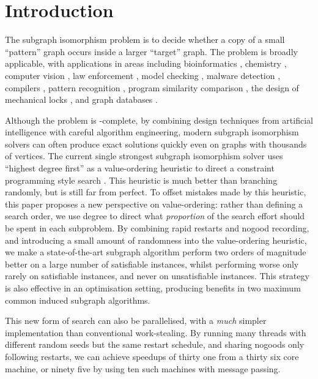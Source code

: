 \documentclass[runningheads]{llncs}
\begin{document}
\section{Introduction}

The subgraph isomorphism problem is to decide whether a copy of a small ``pattern'' graph occurs
inside a larger ``target'' graph. The problem is broadly applicable, with applications in areas
including bioinformatics \cite{DBLP:journals/bmcbi/BonniciGPSF13}, chemistry \cite{o:Regin95}, computer vision
\cite{DBLP:journals/cviu/DamiandSHJS11,DBLP:journals/pr/SolnonDHJ15}, law enforcement
\cite{DBLP:journals/cacm/CoffmanGM04}, model checking \cite{DBLP:journals/tcs/SevegnaniC15},
malware detection \cite{DBLP:conf/dimva/BruschiMM06}, compilers
\cite{DBLP:conf/cgo/MurrayF12,DBLP:conf/cp/BlindellLCS15}, pattern recognition
\cite{DBLP:journals/ijprai/FoggiaPV14}, program similarity
comparison \cite{o:DallaPredaV17}, the design of mechanical locks
\cite{DBLP:journals/siamrev/VomelLBF17}, and graph databases
\cite{DBLP:journals/jair/McCreeshPST18}.

Although the problem is \NP-complete, by combining design techniques from artificial intelligence
with careful algorithm engineering, modern subgraph isomorphism solvers can often produce exact
solutions quickly even on graphs with thousands of vertices. The current single strongest subgraph
isomorphism solver uses ``highest degree first'' as a value-ordering heuristic to direct a
constraint programming style search
\cite{DBLP:conf/cp/McCreeshP15,DBLP:conf/lion/KotthoffMS16,DBLP:journals/jair/McCreeshPST18}. This
heuristic is much better than branching randomly, but is still far from perfect. To offset mistakes
made by this heuristic, this paper proposes a new perspective on value-ordering: rather than
defining a search order, we use degree to direct what \emph{proportion} of the search effort should
be spent in each subproblem. By combining rapid restarts and nogood recording, and introducing a
small amount of randomness into the value-ordering heuristic, we make a state-of-the-art subgraph
algorithm perform two orders of magnitude better on a large number of satisfiable instances, whilst
performing worse only rarely on satisfiable instances, and never on unsatisfiable instances.  This
strategy is also effective in an optimisation setting, producing benefits in two maximum common
induced subgraph algorithms.

This new form of search can also be parallelised, with a \emph{much} simpler implementation than
conventional work-stealing. By running many threads with different random seeds but the same restart
schedule, and sharing nogoods only following restarts, we can achieve speedups of thirty one from a
thirty six core machine, or ninety five by using ten such machines with message passing.
\end{document}
